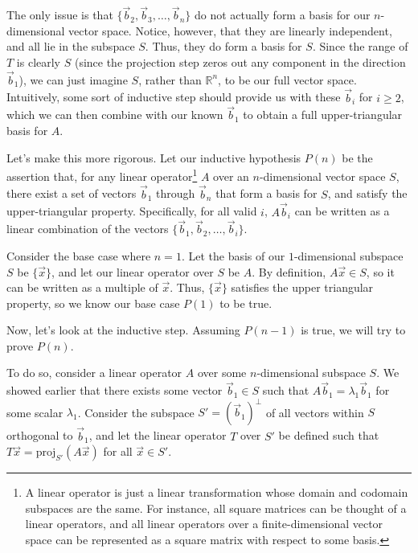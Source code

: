 \documentclass[letterpaper]{article}
\theoremstyle{remark}
\begin{document}
The only issue is that $\{ \vec{b}_2, \vec{b}_3, \ldots, \vec{b}_n \}$ do not actually form a basis for our $n$-dimensional vector space. Notice, however, that they are linearly independent, and all lie in the subspace $S$. Thus, they do form a basis for $S$. Since the range of $T$ is clearly $S$ (since the projection step zeros out any component in the direction $\vec{b}_1$), we can just imagine $S$, rather than $\mathbb{R}^n$, to be our full vector space. Intuitively, some sort of inductive step should provide us with these $\vec{b}_i$ for $i \ge 2$, which we can then combine with our known $\vec{b}_1$ to obtain a full upper-triangular basis for $A$.

Let's make this more rigorous. Let our inductive hypothesis $P(n)$ be the assertion that, for any linear operator\footnote{A linear operator is just a linear transformation whose domain and codomain subspaces are the same. For instance, all square matrices can be thought of a linear operators, and all linear operators over a finite-dimensional vector space can be represented as a square matrix with respect to some basis.} $A$ over an $n$-dimensional vector space $S$, there exist a set of vectors $\vec{b}_1$ through $\vec{b}_n$ that form a basis for $S$, and satisfy the upper-triangular property. Specifically, for all valid $i$, $A\vec{b}_i$ can be written as a linear combination of the vectors $\{\vec{b}_1, \vec{b}_2, \ldots, \vec{b}_i\}$.

Consider the base case where $n = 1$. Let the basis of our $1$-dimensional subspace $S$ be $\{ \vec{x} \}$, and let our linear operator over $S$ be $A$. By definition, $A\vec{x} \in S$, so it can be written as a multiple of $\vec{x}$. Thus, $\{ \vec{x} \}$ satisfies the upper triangular property, so we know our base case $P(1)$ to be true.

Now, let's look at the inductive step. Assuming $P(n-1)$ is true, we will try to prove $P(n)$. 

To do so, consider a linear operator $A$ over some $n$-dimensional subspace $S$. We showed earlier that there exists some vector $\vec{b}_1 \in S$ such that $A\vec{b}_1 = \lambda_1 \vec{b}_1$ for some scalar $\lambda_1$. Consider the subspace $S' = (\vec{b}_1)^\perp$ of all vectors within $S$ orthogonal to $\vec{b}_1$, and let the linear operator $T$ over $S'$ be defined such that $T\vec{x} = \mathrm{proj}_{S'}(A\vec{x})$ for all $\vec{x} \in S'$. 
\end{document}
